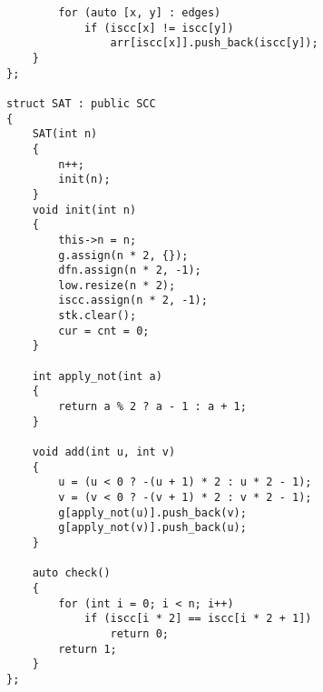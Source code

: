 \documentclass[landscape, 8pt, a4paper, oneside, twocolumn]{extarticle}
\begin{document}
\begin{verbatim}
        for (auto [x, y] : edges)
            if (iscc[x] != iscc[y])
                arr[iscc[x]].push_back(iscc[y]);
    }
};

struct SAT : public SCC
{
    SAT(int n)
    {
        n++;
        init(n);
    }
    void init(int n)
    {
        this->n = n;
        g.assign(n * 2, {});
        dfn.assign(n * 2, -1);
        low.resize(n * 2);
        iscc.assign(n * 2, -1);
        stk.clear();
        cur = cnt = 0;
    }

    int apply_not(int a)
    {
        return a % 2 ? a - 1 : a + 1;
    }

    void add(int u, int v)
    {
        u = (u < 0 ? -(u + 1) * 2 : u * 2 - 1);
        v = (v < 0 ? -(v + 1) * 2 : v * 2 - 1);
        g[apply_not(u)].push_back(v);
        g[apply_not(v)].push_back(u);
    }

    auto check()
    {
        for (int i = 0; i < n; i++)
            if (iscc[i * 2] == iscc[i * 2 + 1])
                return 0;
        return 1;
    }
};
\end{verbatim}
\end{document}
